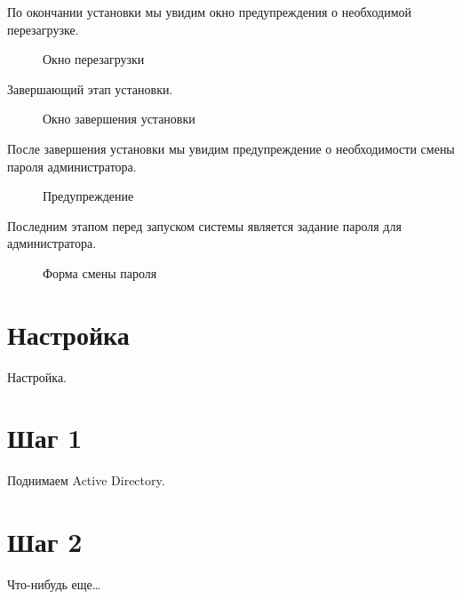 \clearpage
По окончании установки мы увидим окно предупреждения о необходимой перезагрузке.
\begin{figure}[H]
\caption{Окно перезагрузки}
\label{fig1}
\end{figure}
\clearpage
Завершающий этап установки.
\begin{figure}[H]
\caption{Окно завершения установки}
\label{fig1}
\end{figure}
\clearpage
После завершения установки мы увидим предупреждение о необходимости смены пароля администратора.
\begin{figure}[H]
\caption{Предупреждение}
\label{fig1}
\end{figure}
\clearpage
Последним этапом перед запуском системы является задание пароля для администратора.
\begin{figure}[H]
\caption{Форма смены пароля}
\label{fig1}
\end{figure}

\chapter{Настройка}
Настройка.

\chapter{Шаг 1}
Поднимаем Active Directory.

\chapter{Шаг 2}
Что-нибудь еще\ldots